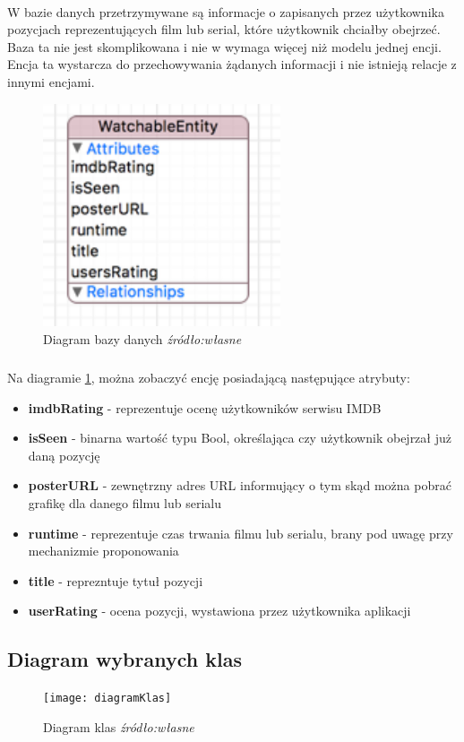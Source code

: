 \documentclass[12pt,oneside,a4paper]{report}
\begin{document}
\paragraph{}W bazie danych przetrzymywane są informacje o zapisanych przez użytkownika pozycjach reprezentujących film lub serial, które użytkownik chciałby obejrzeć. Baza ta nie jest skomplikowana i nie w wymaga więcej niż modelu jednej encji. Encja ta wystarcza do przechowywania żądanych informacji i nie istnieją relacje z innymi encjami.
\begin{figure}[ht!]
	\centering
	\includegraphics[width=7cm]{watchableEntity}
	\caption{Diagram bazy danych 
		\textit{źródło:własne }}
	\label{watchableEntity}
\end{figure}
\subparagraph{}Na diagramie \ref{watchableEntity}, można zobaczyć encję posiadającą następujące atrybuty:
\begin{itemize}
	\item \textbf{imdbRating} - reprezentuje ocenę użytkowników serwisu IMDB
	\item \textbf{isSeen} - binarna wartość typu Bool, określająca czy użytkownik obejrzał już daną pozycję  
	\item \textbf{posterURL} - zewnętrzny adres URL informujący o tym skąd można pobrać grafikę dla danego filmu lub serialu
	\item \textbf{runtime} - reprezentuje czas trwania filmu lub serialu, brany pod uwagę przy mechanizmie proponowania
	\item \textbf{title} - reprezntuje tytuł pozycji
	\item \textbf{userRating} - ocena pozycji, wystawiona przez użytkownika aplikacji 
\end{itemize}
\newpage

\begin{landscape}
	\subsection{Diagram wybranych klas}
	\begin{figure}[ht!]
		\centering
		\texttt{[image: diagramKlas]}
		\caption{Diagram klas
			\textit{źródło:własne}}
		\label{diagramKlas}
	\end{figure}
\end{landscape}
\end{document}
